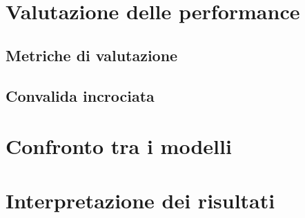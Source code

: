 \label{chap:valutazioni}

%

\section{Valutazione delle performance}
\subsection{Metriche di valutazione}


\subsection{Convalida incrociata}
\section{Confronto tra i modelli}
\section{Interpretazione dei risultati}


